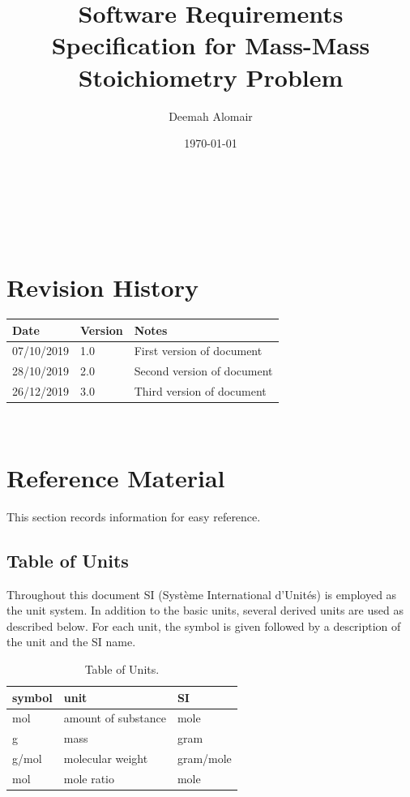 \documentclass[12pt]{article}
\begin{document}
\title{Software Requirements Specification for Mass-Mass Stoichiometry Problem} 
\author{Deemah Alomair}
\date{\today}
	
\maketitle

~\newpage


\tableofcontents

~\newpage

\section*{Revision History}

\begin{tabularx}{\textwidth}{p{3cm}p{2cm}X}
\toprule {\bf Date} & {\bf Version} & {\bf Notes}\\
\midrule
07/10/2019 & 1.0 &  First version of document\\
28/10/2019 & 2.0 &  Second version of document\\
26/12/2019 & 3.0 &  Third version of document\\
\bottomrule
\end{tabularx}

~\newpage

\section{Reference Material}

This section records information for easy reference.

\subsection{Table of Units}

Throughout this document SI (Syst\`{e}me International d'Unit\'{e}s) is employed
as the unit system.  In addition to the basic units, several derived units are
used as described below.  For each unit, the symbol is given followed by a
description of the unit and the SI name.
~\newline

\renewcommand{\arraystretch}{1.2}
\begin{table}[ht]
  \noindent \begin{tabular}{l l l} 
    \toprule		
    \textbf{symbol} & \textbf{unit} & \textbf{SI}\\
    \midrule 
    \si{\mol} & amount of substance & mole\\
    \si{\gram} & mass	& gram\\
    \si{\gram / \mol} & molecular weight & gram/mole \\
    \si{\mol} & mole ratio & mole\\
       \bottomrule
       \hline
  \end{tabular}  
\caption{Table of Units. }

   \end{table}
  
\end{document}
